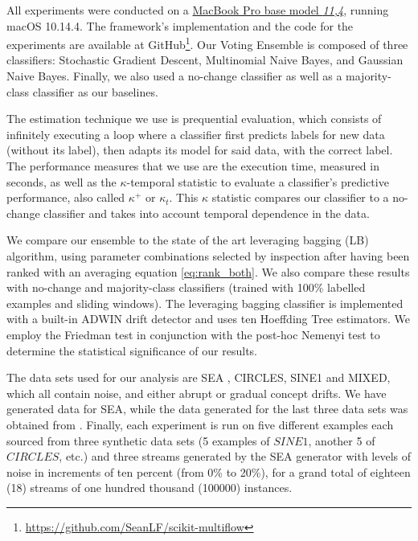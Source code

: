 \documentclass[runningheads]{llncs}
\begin{document}
All experiments were conducted on a \href{https://everymac.com/systems/apple/macbook_pro/specs/macbook-pro-core-i7-2.2-15-iris-only-mid-2015-retina-display-specs.html}{MacBook Pro base model \textit{11,4}}, running macOS 10.14.4. The framework's implementation and the code for the experiments are available at GitHub\footnote{\url{https://github.com/SeanLF/scikit-multiflow}}.
Our Voting Ensemble is composed of three classifiers: Stochastic Gradient Descent, Multinomial Naive Bayes, and Gaussian Naive Bayes. Finally, we also used a no-change classifier as well as a majority-class classifier as our baselines.

The estimation technique we use is prequential evaluation, which consists of infinitely executing a loop where a classifier first predicts labels for new data (without its label), then adapts its model for said data, with the correct label.
The performance measures that we use are the execution time, measured in seconds, as well as the $\kappa$-temporal statistic to evaluate a classifier's predictive performance, also called $\kappa^+$ or $\kappa_t$. This $\kappa$ statistic compares our classifier to a no-change classifier and takes into account temporal dependence in the data.

We compare our ensemble to the state of the art leveraging bagging (LB) algorithm, using parameter combinations selected by inspection after having been ranked with an averaging equation \ref{eq:rank_both}. We also compare these results with no-change and majority-class classifiers (trained with 100\% labelled examples and sliding windows). The leveraging bagging classifier is implemented with a built-in ADWIN drift detector and uses ten Hoeffding Tree estimators. We employ the Friedman test in conjunction with the post-hoc Nemenyi test to determine the statistical significance of our results.

The data sets used for our analysis are SEA \cite{street2001streaming}, CIRCLES, SINE1 and MIXED, which all contain noise, and either abrupt or gradual concept drifts. We have generated data for SEA, while the data generated for the last three data sets was obtained from \cite{pesaranghader2016fast}. Finally, each experiment is run on five different examples each sourced from three synthetic data sets (5 examples of $SINE1$, another 5 of $CIRCLES$, etc.) and three streams generated by the SEA generator with levels of noise in increments of ten percent (from 0\% to 20\%), for a grand total of eighteen (18) streams of one hundred thousand (100000) instances.
\end{document}
